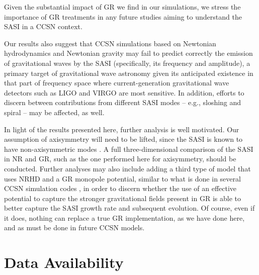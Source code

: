 Given the substantial impact of GR we find in our simulations,
we stress the importance of GR treatments in any future studies
aiming to understand the SASI in a CCSN context.

Our results also suggest that CCSN simulations based on Newtonian hydrodynamics
and Newtonian gravity may fail to predict correctly the emission of
gravitational waves by the SASI (specifically, its frequency and amplitude),
a primary target of gravitational wave astronomy given its anticipated existence
in that part of frequency space where current-generation
gravitational wave detectors such as LIGO and VIRGO are most sensitive.
In addition, efforts to discern between contributions from different
SASI modes -- e.g., sloshing and spiral -- may be affected, as well.

In light of the results presented here, further analysis is well motivated.
Our assumption of axisymmetry will need to be lifted, since the SASI is known
to have non-axisymmetric modes \citep{bm2007,bs2007,f2010,f2015}.
A full three-dimensional comparison of the SASI in NR and GR, such as the one
performed here for axisymmetry, should be conducted.
Further analyses may also include adding a third type of model that uses
NRHD and a GR monopole potential,
similar to what is done in several CCSN simulation
codes \citep[e.g.,][]{rj2002,ktf2018,sdb2019,bbh2020},
in order to discern whether the use
of an effective potential to capture the stronger gravitational fields present
in GR is able to better capture the SASI growth rate and subsequent evolution.
Of course, even if it does, nothing can replace a true GR implementation,
as we have done here, and as must be done in future CCSN models.

\section{Data Availability}



